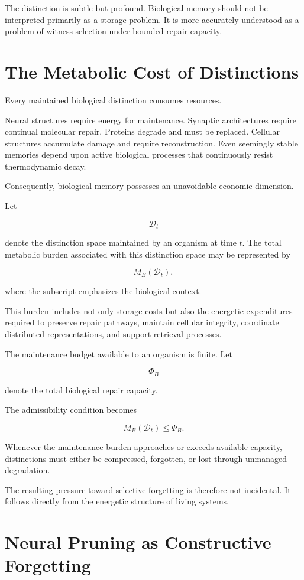\documentclass[12pt,oneside]{book}
\theoremstyle{plain} \newtheorem{theorem}{Theorem}[chapter] \newtheorem{lemma}[theorem]{Lemma} \newtheorem{proposition}[theorem]{Proposition} \newtheorem{corollary}[theorem]{Corollary}
\theoremstyle{definition} \newtheorem{definition}[theorem]{Definition} \newtheorem{axiom}[theorem]{Axiom} \newtheorem{construction}[theorem]{Construction}
\theoremstyle{remark} \newtheorem{remark}[theorem]{Remark} \newtheorem{example}[theorem]{Example}
\newcommand{\D}{\mathcal{D}} \newcommand{\R}{\mathcal{R}} \newcommand{\F}{\mathcal{F}} \newcommand{\U}{\mathcal{U}} \newcommand{\M}{\mathcal{M}} \newcommand{\G}{\Gamma}
\begin{document}
The distinction is subtle but profound. Biological memory should not be interpreted primarily as a storage problem. It is more accurately understood as a problem of witness selection under bounded repair capacity.

\section{The Metabolic Cost of Distinctions}

Every maintained biological distinction consumes resources.

Neural structures require energy for maintenance. Synaptic architectures require continual molecular repair. Proteins degrade and must be replaced. Cellular structures accumulate damage and require reconstruction. Even seemingly stable memories depend upon active biological processes that continuously resist thermodynamic decay.

Consequently, biological memory possesses an unavoidable economic dimension.

Let

\[
\D_t
\]

denote the distinction space maintained by an organism at time $t$. The total metabolic burden associated with this distinction space may be represented by

\[
M_B(\D_t),
\]

where the subscript emphasizes the biological context.

This burden includes not only storage costs but also the energetic expenditures required to preserve repair pathways, maintain cellular integrity, coordinate distributed representations, and support retrieval processes.

The maintenance budget available to an organism is finite. Let

\[
\Phi_B
\]

denote the total biological repair capacity.

The admissibility condition becomes

\[
M_B(\D_t)
\leq
\Phi_B.
\]

Whenever the maintenance burden approaches or exceeds available capacity, distinctions must either be compressed, forgotten, or lost through unmanaged degradation.

The resulting pressure toward selective forgetting is therefore not incidental. It follows directly from the energetic structure of living systems.

\section{Neural Pruning as Constructive Forgetting}
\end{document}
